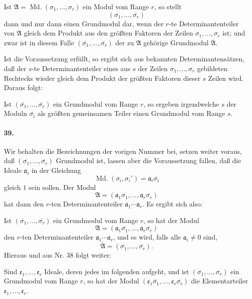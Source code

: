\documentclass[11pt]{article}
\newcommand{\Md}{\operatorname{Md.}}
\begin{document}
Ist $\mathfrak A=\Md(\sigma_1,
\ldots,
\sigma_r)$ ein Modul vom Range $r$, so stellt
\[
(\overline{\sigma_1},
\ldots,
\overline{\sigma_r})
\]
dann und nur dann einen Grundmodul dar, wenn der $r$-te Determinantenteiler von $\mathfrak A$ gleich dem Produkt aus den größten Faktoren der Zeilen $\sigma_1,
\ldots,
\sigma_r$ ist; und zwar ist in diesem Falle $(\overline{\sigma_1},
\ldots,
\overline{\sigma_r})$ der zu $\mathfrak A$ gehörige Grundmodul $\overline{\mathfrak A}$.

Ist die Voraussetzung erfüllt, so ergibt sich aus bekannten Determinantensätzen, daß der $s$-te Determinantenteiler eines aus $s$ der Zeilen $\sigma_1,
\ldots,
\sigma_r$ gebildeten Rechtecks wieder gleich dem Produkt der größten Faktoren dieser $s$ Zeilen wird. Daraus folgt:

Ist $(\overline{\sigma_1},
\ldots,
\overline{\sigma_r})$ ein Grundmodul vom Range $r$, so ergeben irgendwelche $s$ der Moduln $\overline{\sigma_i}$ als größten gemeinsamen Teiler einen Grundmodul vom Range $s$.

\paragraph{39.}
Wir behalten die Bezeichnungen der vorigen Nummer bei, setzen weiter voraus, daß $(\overline{\sigma_1},
\ldots,
\overline{\sigma_r})$ Grundmodul ist, lassen aber die Voraussetzung fallen, daß die Ideale $\mathfrak a_i$ in der Gleichung
\[
\Md(\sigma_i,
\sigma_i')=\mathfrak a_i\overline{\sigma_i}
\]
gleich $1$ sein sollen. Der Modul
\[
\mathfrak A=(\mathfrak a_1\overline{\sigma_1},
\ldots,
\mathfrak a_r\overline{\sigma_r})
\]
hat dann den $r$-ten Determinantenteiler $\mathfrak a_1\cdots\mathfrak a_r$. Es ergibt sich also:

Ist $(\overline{\sigma_1},
\ldots,
\overline{\sigma_r})$ ein Grundmodul vom Range $r$, so hat der Modul
\[
\mathfrak A=(\mathfrak a_1\overline{\sigma_1},
\ldots,
\mathfrak a_r\overline{\sigma_r})
\]
den $r$-ten Determinantenteiler $\mathfrak a_1\cdots\mathfrak a_r$, und es wird, falls alle $\mathfrak a_i\ne0$ sind,
\[
\overline{\mathfrak A}=(\overline{\sigma_1},
\ldots,
\overline{\sigma_r}).
\]
Hieraus und aus Nr. 38 folgt weiter:

Sind $\mathfrak e_1,
\ldots,
\mathfrak e_r$ Ideale, deren jedes im folgenden aufgeht, und ist $(\overline{\sigma_1},
\ldots,
\overline{\sigma_r})$ ein Grundmodul vom Range $r$, so hat der Modul $(\mathfrak e_1\overline{\sigma_1},
\ldots,
\mathfrak e_r\overline{\sigma_r})$ die Elementarteiler $\mathfrak e_1,
\ldots,
\mathfrak e_r$.
\end{document}
